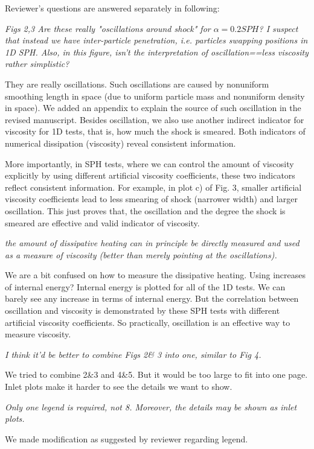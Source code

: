 \documentclass[10pt,a4paper]{article}
\begin{document}
Reviewer's questions are answered separately in following: 

\textit{Figs 2,3 Are these really "oscillations around shock" for $\alpha =0.2 SPH$? I suspect that instead we have inter-particle penetration, i.e.
particles swapping positions in 1D SPH. Also, in this figure, isn't the interpretation of oscillation==less viscosity rather simplistic? }

They are really oscillations. Such oscillations are caused by nonuniform smoothing length in space (due to uniform particle mass and nonuniform density in space). We added an appendix to explain the source of such oscillation in the revised manuscript.
Besides oscillation, we also use another indirect indicator for viscosity for 1D tests, that is, how much the shock is smeared. Both indicators of numerical dissipation (viscosity) reveal consistent information. 

More importantly, in SPH tests, where we can control the amount of viscosity explicitly by using different artificial viscosity coefficients, these two indicators reflect consistent information. For example, in plot c) of Fig. 3, smaller artificial viscosity coefficients lead to less smearing of shock (narrower width) and larger oscillation. This just proves that, the oscillation and the degree the shock is smeared are effective and valid indicator of viscosity.

\textit{the amount of dissipative heating can in principle be directly measured and used as a measure of viscosity (better than merely pointing at the oscillations).}  

We are a bit confused on how to measure the dissipative heating. Using increases of internal energy? Internal energy is plotted for all of the 1D tests. We can barely see any increase in terms of internal energy. But the correlation between oscillation and viscosity is demonstrated by these SPH tests with different artificial viscosity coefficients. So practically, oscillation is an effective way to measure viscosity.

\textit{I think it'd be better to combine Figs 2\& 3 into one, similar to Fig 4.}

We tried to combine 2\&3 and 4\&5. But it would be too large to fit into one page. Inlet plots make it harder to see the details we want to show.

\textit{Only one legend is required, not 8. Moreover, the details may be shown as inlet plots.} 

We made modification as suggested by reviewer regarding legend.
\\[3pt]
\end{document}
